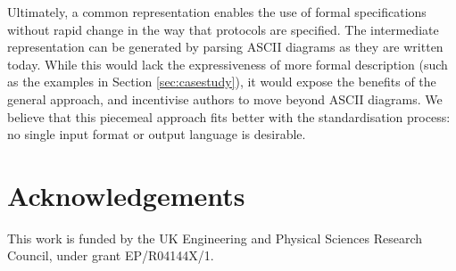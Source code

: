 \documentclass[10pt,sigconf]{acmart}
\begin{document}
Ultimately, a common representation enables the use of formal specifications without rapid
change in the way that protocols are specified. The intermediate representation can be
generated by parsing ASCII diagrams as they are written today. While this would lack the
expressiveness of more formal description (such as the examples in Section
\ref{sec:casestudy}), it would expose the benefits of the general approach, and
incentivise authors to move beyond ASCII diagrams. We believe that this piecemeal approach
fits better with the standardisation process: no single input format or output language is
desirable.

\section{Acknowledgements}

This work is funded by the UK Engineering and Physical Sciences Research Council, under
grant EP/R04144X/1.


%
%    



\ifpdf
  \ifdefined\pdftrailerid
    \pdftrailerid{}
  \fi
\fi
\end{document}
